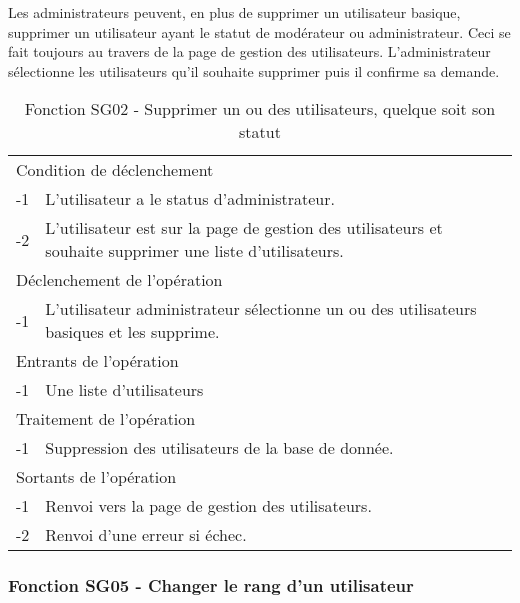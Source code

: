 \documentclass[a4paper]{article}
\begin{document}
Les administrateurs peuvent, en plus de supprimer un utilisateur basique, supprimer un utilisateur ayant le statut de modérateur ou administrateur. Ceci se fait toujours au travers de la page de gestion des utilisateurs. L'administrateur sélectionne les utilisateurs qu'il souhaite supprimer puis il confirme sa demande.

\begin{table}[H]
  \centering
   \small
	\begin{tabular}{|c|p{12cm}|}
   		\hline
   			\rowcolor{lightgray}\multicolumn{2}{|c|}{\textbf{Fonction SG02 - Supprimer un ou des utilisateurs}} \\
   		\hline
   			\multicolumn{2}{|l|}{Condition de déclenchement} \\
   		\hline
   			-1 & L'utilisateur a le status d'administrateur.\\
        			-2 & L'utilisateur est sur la page de gestion des utilisateurs et souhaite supprimer une liste d'utilisateurs.\\
   		\hline
   			\multicolumn{2}{|l|}{Déclenchement de l'opération} \\
   		\hline
   			-1 & L'utilisateur administrateur sélectionne un ou des utilisateurs basiques et les supprime.\\
   		\hline
   			\multicolumn{2}{|l|}{Entrants de l'opération} \\
   		\hline
   			-1 & Une liste d'utilisateurs\\
   		\hline
   			\multicolumn{2}{|l|}{Traitement de l'opération} \\
  		\hline
   			-1 & Suppression des utilisateurs de la base de donnée.\\
   		\hline
   			\multicolumn{2}{|l|}{Sortants de l'opération} \\
   		\hline
   			-1 & Renvoi vers la page de gestion des utilisateurs.\\
        			-2 & Renvoi d'une erreur si échec.\\ 
   		\hline
	\end{tabular}
  \caption{Fonction SG02 - Supprimer un ou des utilisateurs, quelque soit son statut}
  \normalsize
  \label{tab: supprimmer_utilisateur}
\end{table}

\subsubsection{Fonction SG05 - Changer le rang d'un utilisateur}
\end{document}
